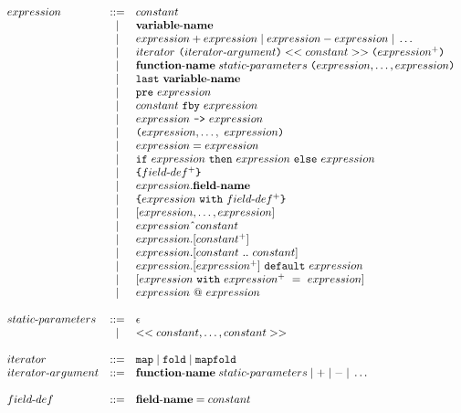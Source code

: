 \documentclass[a4paper]{article}
\newcommand{\p}[0]{\; \vert \;}
\newcommand{\Coloneqq}[0]{::=}
\begin{document}
\[\begin{array}{lcl}
  expression & \Coloneqq & constant \\
  & | & {\bf variable\sdash{}name} \\
  & | & expression + expression \p expression - expression \p \dots \\
  & | &
    iterator \  \lp{}iterator\sdash{}argument\rp{}
    \piquots{constant} \lp{}expression^+\rp{}
    \\
  & | &
    {\bf function\sdash{}name} \; static\sdash{}parameters \;
    \lp{}expression,\dots,expression\rp{} \\
  & | & \mathtt{last} \  {\bf variable\sdash{}name} \\
  & | & \mathtt{pre} \  expression \\
  & | & constant \  \mathtt{fby} \  expression \\
  & | & expression \  \texttt{->} \  expression \\
  & | & \lp{}expression,\dots,\ expression\rp{} \\
  & | & expression = expression \\
  & | & \mathtt{if} \ expression \ \mathtt{then} \ expression \ 
    \mathtt{else} \ expression \\
  & | & \lcb{} field\sdash{}def^+ \rcb{} \\
  & | & expression.{\bf field\sdash{}name} \\
  & | & \lcb{} expression
    \ \mathtt{with} \  field\sdash{}def^+ \rcb{} \\
  & | & [ expression, \dots, expression ] \\
  & | & expression \spow{} constant \\
  & | & expression.[constant^+] \\
  & | & expression.[constant \  .. \ constant] \\
  & | & expression.[expression^+] \ \mathtt{default} \  expression \\
  & | & [ expression \ \mathtt{with} \ expression^+ \ = \ expression ] \\
  & | & expression \ @ \ expression \\

  \\

  static\sdash{}parameters & \Coloneqq & \epsilon \\
  & | & \piquots{constant,\dots,constant} \\

  \\

  iterator & \Coloneqq & \mathtt{map} \p \mathtt{fold} \p \mathtt{mapfold} \\
  iterator\sdash{}argument & \Coloneqq &
    {\bf function\sdash{}name} \; static\sdash{}parameters
    \p \mathtt{+} \p \mathtt{-} \p \dots \\

  \\

  field\sdash{}def & \Coloneqq & {\bf field\sdash{}name} = constant
\end{array}
\]
\end{document}
